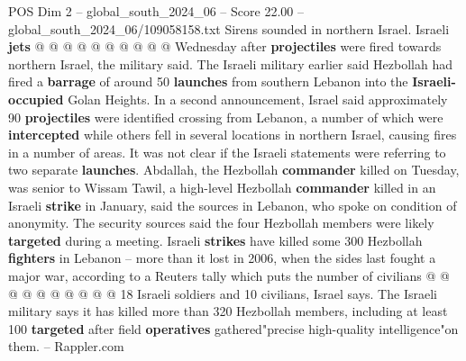 \begin{textsample}{POS Dim 2 – global\_south\_2024\_06 – Score 22.00 – global\_south\_2024\_06/109058158.txt}
Sirens sounded in northern Israel.
Israeli \textbf{jets} @ @ @ @ @ @ @ @ @ @ Wednesday after \textbf{projectiles} were fired towards northern Israel, the military said.
The Israeli military earlier said Hezbollah had fired a \textbf{barrage} of around 50 \textbf{launches} from southern Lebanon into the \textbf{Israeli-occupied} Golan Heights.
In a second announcement, Israel said approximately 90 \textbf{projectiles} were identified crossing from Lebanon, a number of which were \textbf{intercepted} while others fell in several locations in northern Israel, causing fires in a number of areas.
It was not clear if the Israeli statements were referring to two separate \textbf{launches}.
Abdallah, the Hezbollah \textbf{commander} killed on Tuesday, was senior to Wissam Tawil, a high-level Hezbollah \textbf{commander} killed in an Israeli \textbf{strike} in January, said the sources in Lebanon, who spoke on condition of anonymity.
The security sources said the four Hezbollah members were likely \textbf{targeted} during a meeting.
Israeli \textbf{strikes} have killed some 300 Hezbollah \textbf{fighters} in Lebanon -- more than it lost in 2006, when the sides last fought a major war, according to a Reuters tally which puts the number of civilians @ @ @ @ @ @ @ @ @ @ 18 Israeli soldiers and 10 civilians, Israel says.
The Israeli military says it has killed more than 320 Hezbollah members, including at least 100 \textbf{targeted} after field \textbf{operatives} gathered"precise high-quality intelligence"on them. -- Rappler.com

\end{textsample}
